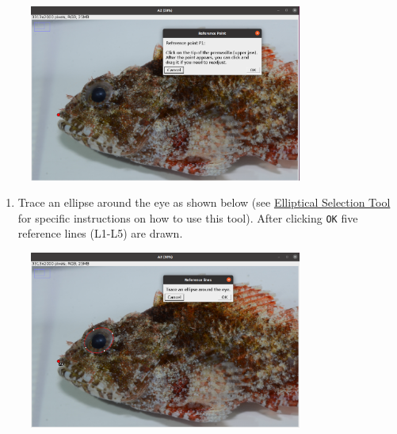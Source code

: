 \documentclass[
  letterpaper,
  DIV=11,
  numbers=noendperiod,
  oneside]{scrreprt}
\providecommand{\tightlist}{%
  \setlength{\itemsep}{0pt}\setlength{\parskip}{0pt}}\usepackage{longtable,booktabs,array}
\begin{document}
\begin{figure}

{\centering \includegraphics[width=0.8\textwidth,height=\textheight]{./images/screenshots/tip_upper_jaw_head.png}

}

\end{figure}

\begin{enumerate}
\def\labelenumi{\arabic{enumi}.}
\setcounter{enumi}{3}
\tightlist
\item
  Trace an ellipse around the eye as shown below (see
  \href{https://imagej.nih.gov/ij/docs/guide/146-19.html}{Elliptical
  Selection Tool} for specific instructions on how to use this tool).
  After clicking \texttt{OK} five reference lines (L1-L5) are drawn.
\end{enumerate}

\begin{figure}

{\centering \includegraphics[width=0.8\textwidth,height=\textheight]{./images/screenshots/eye_ellipse_head.png}

}

\end{figure}
\end{document}
